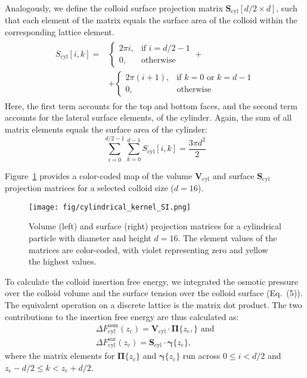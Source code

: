 \documentclass[10pt, a4paper, twocolumn]{article}
\begin{document}
Analogously, we define the colloid surface projection matrix $\bm{S}_{\text{cyl}}[d/2 \times d]$, such that each element of the matrix equals the surface area of the colloid within the corresponding lattice element.
\begin{align}
    \begin{split}
        S_{\text{cyl}}[i, k] = 
        &\begin{cases}
            2 \pi i,   & \text{if } i = d/2 - 1 \\
            0,         & \text{otherwise}
        \end{cases} +
        \\
        &+
        \begin{cases}
            2 \pi (i + 1), & \text{if } k = 0 \text{ or } k = d - 1 \\
            0,             & \text{otherwise}
        \end{cases}
    \end{split}
\end{align}
Here, the first term accounts for the top and bottom faces, and the second term accounts for the lateral surface elements, of the cylinder.
Again, the sum of all matrix elements equals the surface area of the cylinder:
\begin{equation*}
    \sum_{i=0}^{d/2 - 1} \sum_{k=0}^{d - 1} S_{\text{cyl}}[i, k] = \frac{3 \pi d^2}{2}
\end{equation*}

Figure~\ref{fig:cylindrical_kernel_SI} provides a color-coded map of the volume $\bm{V}_{\text{cyl}}$ and surface $\bm{S}_{\text{cyl}}$ projection matrices for a selected colloid size ($d = 16$).

\begin{figure}[h]
    \centering
    \texttt{[image: fig/cylindrical\_kernel\_SI.png]}
    \caption{
    Volume (left) and surface (right) projection matrices for a cylindrical particle with diameter and height $d = 16$. The element values of the matrices are color-coded, with violet representing zero and yellow the highest values.
    }
    \label{fig:cylindrical_kernel_SI}
\end{figure}

To calculate the colloid insertion free energy, we integrated the osmotic pressure over the colloid volume and the surface tension over the colloid surface (Eq.~(5)).
The equivalent operation on a discrete lattice is the matrix dot product.
The two contributions to the insertion free energy are thus calculated as:
\begin{equation}\label{eq:cyl_fe_osm}
    \begin{split}
        \Delta F_{\text{cyl}}^{\text{osm}}(z_{\text{c}}) = \bm{V}_{\text{cyl}} \cdot \boldsymbol{\Pi}\{z_{\text{c}},\} \text{ and}
        \\
        \Delta F_{\text{cyl}}^{\text{sur}}(z_{\text{c}}) = \bm{S}_{\text{cyl}} \cdot \boldsymbol{\gamma}\{z_{\text{c}}\},
    \end{split}
\end{equation}
where the matrix elements for $\boldsymbol{\Pi}\{z_{\text{c}}\}$ and $\boldsymbol{\gamma}\{z_{\text{c}}\}$ run across $0 \leq i < d/2$ and $z_{\text{c}} - d/2 \leq k < z_{\text{c}} + d/2$.
\end{document}
